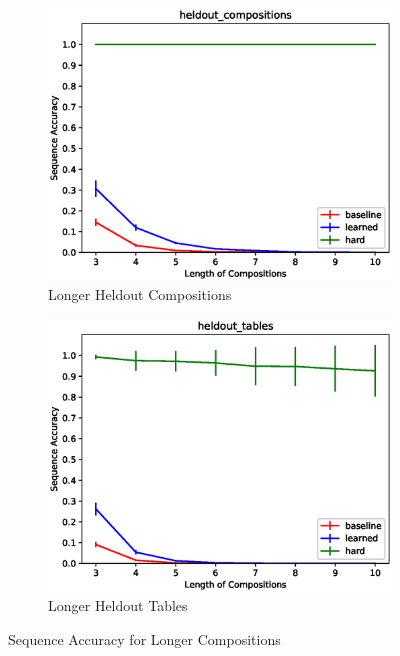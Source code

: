 \begin{figure}[ht] 
	\begin{subfigure}[b]{0.5\linewidth}
		\centering
		\includegraphics[width=0.95\linewidth]{./figs/lookup/heldout_compositions_eps}
		\caption{Longer Heldout Compositions} 
		\label{lt_longer1} 
		\vspace{2ex}
	\end{subfigure}%
	\begin{subfigure}[b]{0.5\linewidth}
		\centering
		\includegraphics[width=0.95\linewidth]{./figs/lookup/heldout_tables_eps}
		\caption{Longer Heldout Tables} 
		\label{lt_longer2} 
		\vspace{2ex}
	\end{subfigure}
	\caption{Sequence Accuracy for Longer Compositions}
	\label{lt_longer}
\end{figure}




